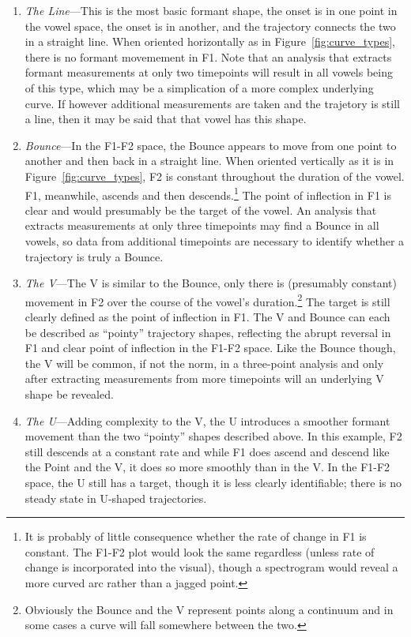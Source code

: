 \begin{enumerate}
  \item \textit{The Line}---This is the most basic formant shape, the onset is in one point in the vowel space, the onset is in another, and the trajectory connects the two in a straight line. When oriented horizontally as in Figure~\ref{fig:curve_types}, there is no formant movemement in F1. Note that an analysis that extracts formant measurements at only two timepoints will result in all vowels being of this type, which may be a simplication of a more complex underlying curve. If however additional measurements are taken and the trajetory is still a line, then it may be said that that vowel has this shape.
  \item \textit{Bounce}---In the F1-F2 space, the Bounce appears to move from one point to another and then back in a straight line. When oriented vertically as it is in Figure~\ref{fig:curve_types}, F2 is constant throughout the duration of the vowel. F1, meanwhile, ascends and then descends.\footnote{It is probably of little consequence whether the rate of change in F1 is constant. The F1-F2 plot would look the same regardless (unless rate of change is incorporated into the visual), though a spectrogram would reveal a more curved arc rather than a jagged point.} The point of inflection in F1 is clear and would presumably be the target of the vowel. An analysis that extracts measurements at only three timepoints may find a Bounce in all vowels, so data from additional timepoints are necessary to identify whether a trajectory is truly a Bounce.
  \item \textit{The V}---The V is similar to the Bounce, only there is (presumably constant) movement in F2 over the course of the vowel's duration.\footnote{Obviously the Bounce and the V represent points along a continuum and in some cases a curve will fall somewhere between the two.} The target is still clearly defined as the point of inflection in F1. The V and Bounce can each be described as ``pointy'' trajectory shapes, reflecting the abrupt reversal in F1 and clear point of inflection in the F1-F2 space. Like the Bounce though, the V will be common, if not the norm, in a three-point analysis and only after extracting measurements from more timepoints will an underlying V shape be revealed.
  \item \textit{The U}---Adding complexity to the V, the U introduces a smoother formant movement than the two ``pointy'' shapes described above. In this example, F2 still descends at a constant rate and while F1 does ascend and descend like the Point and the V, it does so more smoothly than in the V. In the F1-F2 space, the U still has a target, though it is less clearly identifiable; there is no steady state in U-shaped trajectories.

\end{enumerate}
